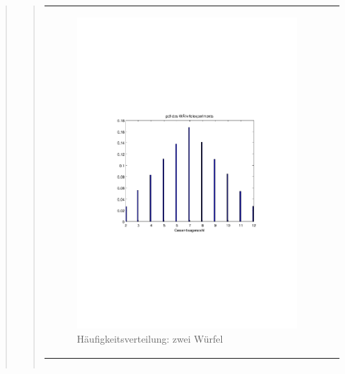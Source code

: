 \begin{quote}
\begin{quote}
\begin{center}
\begin{tabular}{ll}
            \begin{minipage}{0.6\textwidth}
                \begin{figure}[H]
                    \label{fig:pico_funktion0alpha}
                    \includegraphics[scale=0.7, trim = 20mm 80mm 20mm 90mm, clip]{Bilder/A1_2}
                    \caption{Häufigkeitsverteilung: zwei Würfel}
                \end{figure}
        
            \end{minipage}
        
        \end{tabular}
        \end{center}

        \begin{center}
        \begin{tabular}{ll}
        

\end{tabular}
\end{center}
\end{quote}
\end{quote}
